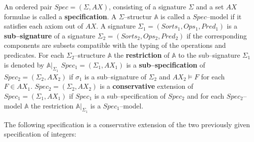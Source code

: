 \documentclass[landscape, autoslides, light]{mmiss}
\begin{document}
\begin{Package}[Label={FSDPT}, Title={Formal Specification of Data and Process Types}, ShortTitle={FSDPT}, Authors={Horst Reichel}, Date={February 2003}, LevelOfDetail=Lecture, Language=en-GB]
\begin{Section}[Title={Initial Algebras as Data Types}, Label={section3}]
\begin{Section}[Title={Functional Enrichment of Data Types}, Label={section3_3}]
\begin{Paragraph}[Title={Equivalence of Specifications}, Label=Paragraph54]
\begin{Definition}[Title = {Initial Algebras as Data Types}, Label = {Definition1}]
\begin{List}[ListType=enumeration]
    \ListItem An ordered pair $Spec = (\Sigma, AX)$, consisting of a
signature $\Sigma$ and a set $AX$ formulae is called a
\textbf{specification}. A $\Sigma$--structur $ \mathbb{A}$ is
called a $Spec$--model if it satisfies each axiom out of $AX$.
\pause
 \ListItem A signature $\Sigma_1 = ( Sorts_1, Ops_1, Pred_1)$ is
a \textbf{sub--signature} of a signature $\Sigma_2 = ( Sorts_2,
Ops_2, Pred_2)$ if the corresponding components are subsets
compatible with the typing of the operations and predicates. For
each $\Sigma_2$--structure $ \mathbb{A}$ the \textbf{restriction}
of $ \mathbb{A}$ to the sub--signature $\Sigma_1$ is denoted by $
\mathbb{A}|_{\Sigma_{1}}$
 \pause
  \ListItem $Spec_1 = (\Sigma_1, AX_1)$
is a \textbf{sub--specification} of $Spec_2 = (\Sigma_2, AX_2)$ if
$\sigma_1$ is a sub--signature of $\Sigma_2$ and $AX_2 \models F $
for each $F \in  AX_1$.
 \pause
 \ListItem  $Spec_2 = (\Sigma_2, AX_2)$ is a \textbf{conservative} extension
 of $Spec_1 = (\Sigma_1, AX_1)$ if $Spec_1$ is a
 sub--specification of $Spec_2$ and for each $Spec_2$--model
 $\mathbb{A}$ the restriction $\mathbb{A}|_{\Sigma_{1}}$ is a
 $Spec_1$--model.
\end{List}
\end{Definition}
\pause
 \vspace{2cm}
 The following specification  is a conservative extension of the
two previously given specification of integers:


\end{Paragraph}
\begin{Paragraph}[Label=Paragraph55]
\footnotesize



\end{Paragraph}
\end{Section}
\end{Section}
\end{Package}
\end{document}
